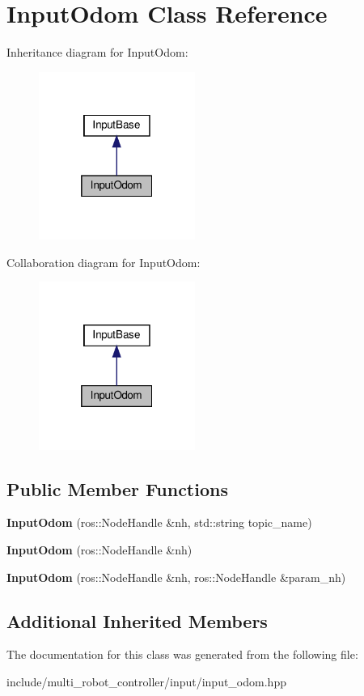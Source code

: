 \hypertarget{classInputOdom}{}\section{Input\+Odom Class Reference}
\label{classInputOdom}


Inheritance diagram for Input\+Odom\+:\nopagebreak
\begin{figure}[H]
\begin{center}
\leavevmode
\includegraphics[width=145pt]{d6/dba/classInputOdom__inherit__graph}
\end{center}
\end{figure}


Collaboration diagram for Input\+Odom\+:\nopagebreak
\begin{figure}[H]
\begin{center}
\leavevmode
\includegraphics[width=145pt]{d5/dc5/classInputOdom__coll__graph}
\end{center}
\end{figure}
\subsection*{Public Member Functions}
\begin{DoxyCompactItemize}
\item 
{\bfseries Input\+Odom} (ros\+::\+Node\+Handle \&nh, std\+::string topic\+\_\+name)
\item 
{\bfseries Input\+Odom} (ros\+::\+Node\+Handle \&nh)
\item 
{\bfseries Input\+Odom} (ros\+::\+Node\+Handle \&nh, ros\+::\+Node\+Handle \&param\+\_\+nh)
\end{DoxyCompactItemize}
\subsection*{Additional Inherited Members}


The documentation for this class was generated from the following file\+:\begin{DoxyCompactItemize}
\item 
include/multi\+\_\+robot\+\_\+controller/input/input\+\_\+odom.\+hpp\end{DoxyCompactItemize}
